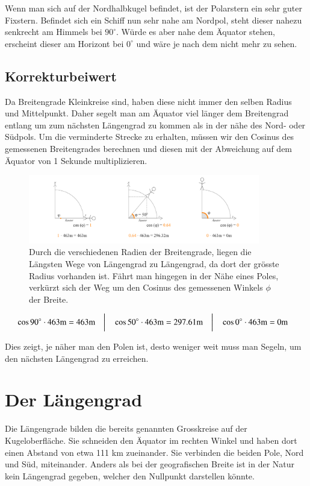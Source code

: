 \begin{refsection}
Wenn man sich auf der Nordhalbkugel befindet, ist der Polarstern ein sehr guter Fixstern. Befindet sich ein Schiff nun sehr nahe am Nordpol, steht dieser nahezu senkrecht am Himmels bei $90^{\circ}$. Würde es aber nahe dem Äquator stehen, erscheint dieser am Horizont bei $0^{\circ}$ und wäre je nach dem nicht mehr zu sehen.


\subsection{Korrekturbeiwert}
Da Breitengrade Kleinkreise sind, haben diese nicht immer den selben Radius und Mittelpunkt. Daher segelt man am Äquator viel länger dem Breitengrad entlang um zum nächsten Längengrad zu kommen als in der nähe des Nord- oder Südpols.
Um die verminderte Strecke zu erhalten, müssen wir den Cosinus des gemessenen Breitengrades berechnen und diesen mit der Abweichung auf dem Äquator von 1 Sekunde multiplizieren.

\begin{figure}[htbp]
\centering
\includegraphics[width=0.9\textwidth]{kugel/Korrekturbeiwert.jpg}
\caption{Durch die verschiedenen Radien der Breitengrade, liegen die Längsten Wege von Längengrad zu Längengrad, da dort der grösste Radius vorhanden ist. Fährt man hingegen in der Nähe eines Poles, verkürzt sich der Weg um den Cosinus des gemessenen Winkels $\phi$ der Breite.}
\end{figure}

\[
\begin{aligned}
&\cos 90^\circ \cdot 463\text{m} = 463\text{m}
&
&\text{\bigg \vert}
&
&\cos 50^\circ \cdot 463\text{m} = 297.61\text{m}
&
&\text{\bigg \vert}
&
&\cos 0^\circ \cdot 463\text{m} = 0\text{m}
\end{aligned}
\]

Dies zeigt, je näher man den Polen ist, desto weniger weit muss man Segeln, um den nächsten Längengrad zu erreichen.



\section{Der Längengrad}
Die Längengrade bilden die bereits genannten Grosskreise auf der Kugeloberfläche.
Sie schneiden den Äquator im rechten Winkel und haben dort einen Abstand von etwa 111 km zueinander. Sie verbinden die beiden Pole, Nord und Süd, miteinander. Anders als bei der geografischen Breite ist in der Natur kein Längengrad gegeben, welcher den Nullpunkt darstellen könnte.


\end{refsection}
